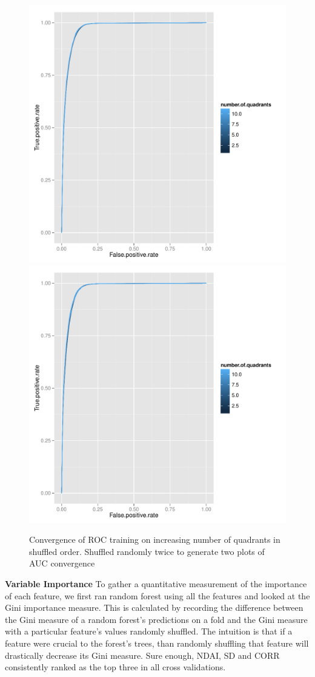 \documentclass{article}\usepackage[]{graphicx}\usepackage[]{color}
\begin{document}
  \begin{figure}[H]
  \includegraphics[width=\linewidth, height = 170pts ]{ROC_converge_shuffle1.pdf}
\endminipage\hfill
{}
  \includegraphics[width=\linewidth, height = 170pts]{ROC_converge_shuffle2.pdf}
\endminipage\hfill
  \caption{Convergence of ROC training on increasing number of quadrants in shuffled order.  Shuffled randomly twice to generate two plots of AUC convergence}\label{}
\end{figure}
  
{\bf Variable Importance} To gather a quantitative measurement of the importance of each feature, we first ran random forest using all the features and looked at the Gini importance measure.  This is calculated by recording the difference between the Gini measure of a random forest's predictions on a fold and the Gini measure with a particular feature's values randomly shuffled.  The intuition is that if a feature were crucial to the forest's trees, than randomly shuffling that feature will drastically decrease its Gini measure.  Sure enough, NDAI, SD and CORR consistently ranked as the top three in all cross validations. \\
\end{document}
